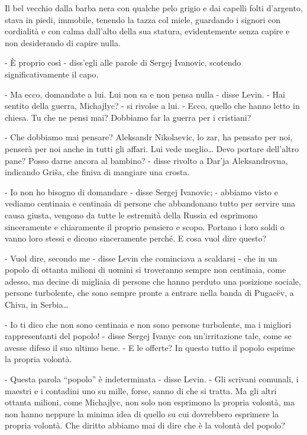 Il bel vecchio dalla barba nera con qualche pelo grigio e dai capelli folti d'argento, stava in piedi, immobile, tenendo la tazza col miele, guardando i signori con cordialità e con calma dall'alto della sua statura, evidentemente senza capire e non desiderando di capire nulla. 

- È proprio così - diss'egli alle parole di Sergej Ivanovic, scotendo significativamente il capo. 

- Ma ecco, domandate a lui. Lui non sa e non pensa nulla - disse Levin. - Hai sentito della guerra, Michajlyc? - si rivolse a lui. - Ecco, quello che hanno letto in chiesa. Tu che ne pensi mai? Dobbiamo far la guerra per i cristiani? 

- Che dobbiamo mai pensare? Aleksandr Nikolaevic, lo zar, ha pensato per noi, penserà per noi anche in tutti gli affari. Lui vede meglio\ldots{} Devo portare dell'altro pane? Posso darne ancora al bambino? - disse rivolto a Dar'ja Aleksandrovna, indicando Griša, che finiva di mangiare una crosta. 

- Io non ho bisogno di domandare - disse Sergej Ivanovic; - abbiamo visto e vediamo centinaia e centinaia di persone che abbandonano tutto per servire una causa giusta, vengono da tutte le estremità della Russia ed esprimono sinceramente e chiaramente il proprio pensiero e scopo. Portano i loro soldi o vanno loro stessi e dicono sinceramente perché. E cosa vuol dire questo? 

- Vuol dire, secondo me - disse Levin che cominciava a scaldarsi - che in un popolo di ottanta milioni di uomini si troveranno sempre non centinaia, come adesso, ma decine di migliaia di persone che hanno perduto una posizione sociale, persone turbolente, che sono sempre pronte a entrare nella banda di Pugacëv, a Chiva, in Serbia\ldots{} 

- Io ti dico che non sono centinaia e non sono persone turbolente, ma i migliori rappresentanti del popolo! - disse Sergej Ivanyc con un'irritazione tale, come se avesse difeso il suo ultimo bene. - E le offerte? In questo tutto il popolo esprime la propria volontà. 

- Questa parola ``popolo'' è indeterminata - disse Levin. - Gli scrivani comunali, i maestri e i contadini uno su mille, forse, sanno di che si tratta. Ma gli altri ottanta milioni, come Michajlyc, non solo non esprimono la propria volontà, ma non hanno neppure la minima idea di quello su cui dovrebbero esprimere la propria volontà. Che diritto abbiamo mai di dire che è la volontà del popolo? 


